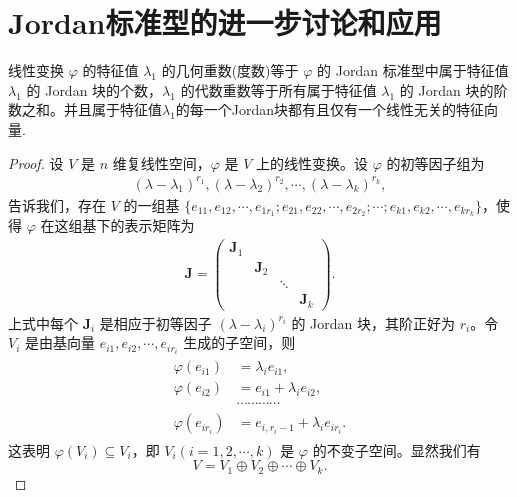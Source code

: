 \documentclass[../../main.tex]{subfiles}%
\begin{document}
\section{Jordan标准型的进一步讨论和应用}

\begin{theorem}\label{theorem:关于一个特征值的Jordan块的个数等于其度数,阶数直和等于其重数}
线性变换 $\varphi$ 的特征值 $\lambda_1$ 的几何重数(度数)等于 $\varphi$ 的 Jordan 标准型中属于特征值 $\lambda_1$ 的 Jordan 块的个数，$\lambda_1$ 的代数重数等于所有属于特征值 $\lambda_1$ 的 Jordan 块的阶数之和。并且属于特征值$\lambda_1$的每一个Jordan块都有且仅有一个线性无关的特征向量.
\end{theorem}
\begin{proof}

设 $V$ 是 $n$ 维复线性空间，$\varphi$ 是 $V$ 上的线性变换。设 $\varphi$ 的初等因子组为
\begin{align}
(\lambda - \lambda_1)^{r_1}, (\lambda - \lambda_2)^{r_2}, \cdots, (\lambda - \lambda_k)^{r_k}, \label{equation--7.7.1}
\end{align}
告诉我们，存在 $V$ 的一组基 $\{e_{11}, e_{12}, \cdots, e_{1r_1}; e_{21}, e_{22}, \cdots, e_{2r_2}; \cdots; e_{k1}, e_{k2}, \cdots, e_{kr_k}\}$，使得 $\varphi$ 在这组基下的表示矩阵为
\begin{align*}
\boldsymbol{J} = 
\begin{pmatrix}
\boldsymbol{J}_1 & & & \\
& \boldsymbol{J}_2 & & \\
& & \ddots & \\
& & & \boldsymbol{J}_k
\end{pmatrix}.
\end{align*}
上式中每个 $\boldsymbol{J}_i$ 是相应于初等因子 $(\lambda - \lambda_i)^{r_i}$ 的 Jordan 块，其阶正好为 $r_i$。令 $V_i$ 是由基向量 $e_{i1}, e_{i2}, \cdots, e_{ir_i}$ 生成的子空间，则
\begin{gather}\label{equation--7.7.2}
\begin{aligned}
\varphi(e_{i1}) &= \lambda_i e_{i1}, 
 \\
\varphi(e_{i2}) &= e_{i1} + \lambda_i e_{i2},  \\
&\cdots\cdots\cdots\cdots \\
\varphi(e_{ir_i}) &= e_{i,r_i - 1} + \lambda_i e_{ir_i}.
\end{aligned}
\end{gather}
这表明 $\varphi(V_i) \subseteq V_i$，即 $V_i (i = 1, 2, \cdots, k)$ 是 $\varphi$ 的不变子空间。显然我们有
\[
V = V_1 \oplus V_2 \oplus \cdots \oplus V_k.
\]


\end{proof}
\end{document}
